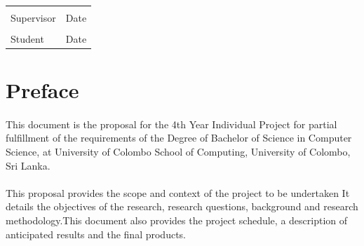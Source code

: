 \documentclass[11pt]{article}
\numberwithin{figure}{section}
\numberwithin{table}{section}
\begin{document}
\paragraph{}
\paragraph{}
\paragraph{}
\paragraph{}
\paragraph{}
\paragraph{}
\paragraph{}

 
	\noindent\begin{tabular}{ll}
		\makebox[2.5in]{\hrulefill} & \makebox[2.5in]{\hrulefill}\\
		Supervisor & Date\\[8ex]%
		\makebox[2.5in]{\hrulefill} & \makebox[2.5in]{\hrulefill}\\
		Student & Date\\
		\end{tabular}
\newpage		
\section*{Preface}
\paragraph{}
This  document is the proposal for  the 4th Year Individual Project  for  partial  fulfillment  of  the requirements of the Degree of Bachelor of Science in Computer Science, at University of Colombo School of Computing, University of Colombo, Sri Lanka.
\paragraph{}
This proposal  provides  the  scope  and  context  of  the  project  to  be  undertaken It details  the objectives of the research,  research  questions,  background and research methodology.This  document also  provides  the project schedule, a description of anticipated results and the final products.
\end{document}
